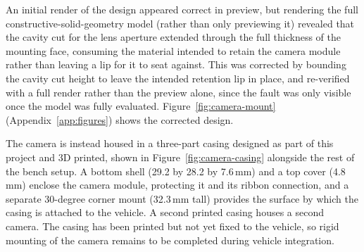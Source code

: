 An initial render of the design appeared correct in preview, but rendering the full constructive-solid-geometry model (rather than only previewing it) revealed that the cavity cut for the lens aperture extended through the full thickness of the mounting face, consuming the material intended to retain the camera module rather than leaving a lip for it to seat against. This was corrected by bounding the cavity cut height to leave the intended retention lip in place, and re-verified with a full render rather than the preview alone, since the fault was only visible once the model was fully evaluated. Figure~\ref{fig:camera-mount} (Appendix~\ref{app:figures}) shows the corrected design.


The camera is instead housed in a three-part casing designed as part of this project and 3D printed, shown in Figure~\ref{fig:camera-casing} alongside the rest of the bench setup. A bottom shell (29.2 by 28.2 by 7.6\,mm) and a top cover (4.8\,mm) enclose the camera module, protecting it and its ribbon connection, and a separate 30-degree corner mount (32.3\,mm tall) provides the surface by which the casing is attached to the vehicle. A second printed casing houses a second camera. The casing has been printed but not yet fixed to the vehicle, so rigid mounting of the camera remains to be completed during vehicle integration.

